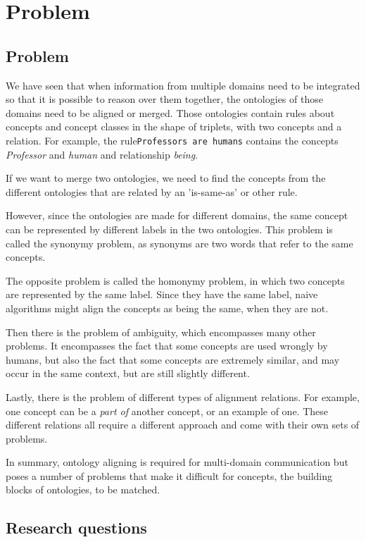 \documentclass{article}
\begin{document}
 \section{Problem}

 \subsection{Problem}
 We have seen that when information from multiple domains need to be integrated so that it is possible to reason over them together, the ontologies of those domains need to be aligned or merged. Those ontologies contain rules about concepts and concept classes in the shape of triplets, with two concepts and a relation. For example, the rule{\tt Professors are humans} contains the concepts \emph{Professor} and \emph{human} and relationship \emph{being}.
 
 If we want to merge two ontologies, we need to find the concepts from the different ontologies that are related by an 'is-same-as' or other rule. 
 
 However, since the ontologies are made for different domains, the same concept can be represented by different labels in the two ontologies. This problem is called the synonymy problem, as synonyms are two words that refer to the same concepts.
 
 The opposite problem is called the homonymy problem, in which two concepts are represented by the same label. Since they have the same label, naive algorithms might align the concepts as being the same, when they are not.
 
 Then there is the problem of ambiguity, which encompasses many other problems. It encompasses the fact that some concepts are used wrongly by humans, but also the fact that some concepts are extremely similar, and may occur in the same context, but are still slightly different.
 
 Lastly, there is the problem of different types of alignment relations. For example, one concept can be a \emph{part of} another concept, or an example of one. These different relations all require a different approach and come with their own sets of problems.
 
 In summary, ontology aligning is required for multi-domain communication but poses a number of problems that make it difficult for concepts, the building blocks of ontologies, to be matched.
 \subsection{Research questions}
 
\end{document}
